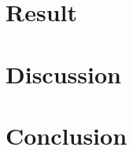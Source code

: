 \documentclass[11pt]{article}
\begin{document}
    \section{Result}\label{sec:result}
    

    \section{Discussion}\label{sec:discussion}
    

    \section{Conclusion}\label{sec:conclusion}
    


    
    
\end{document}

